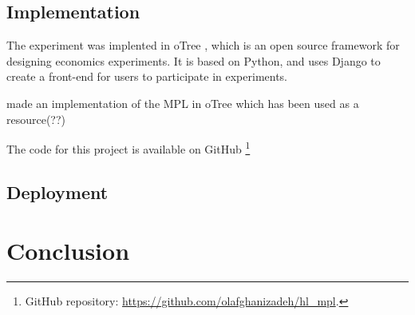 \documentclass [12pt,a4paper,oneside]{article}
\begin{document}
\subsection{Implementation}
The experiment was implented in oTree \textcite{chen_otreeopen-source_2016}, which is an open source framework for designing economics experiments. It is based on Python, and uses Django to create a front-end for users to participate in experiments. 

\textcite{holzmeister_otree_2017} made an implementation of the \textcite{holt_risk_2002} MPL in oTree which has been used as a resource(??)

The code for this project is available on GitHub \footnote{GitHub repository: \url{https://github.com/olafghanizadeh/hl_mpl}.}

\subsection{Deployment}


 

\newpage 
\section{Conclusion}




\printbibliography
\end{document}
